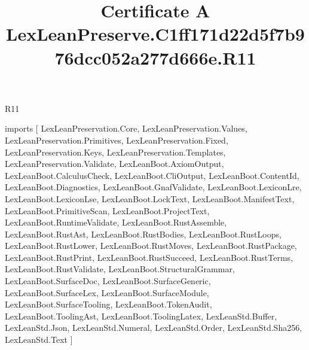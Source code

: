 \begin{lexlean}{R11}
\title{Certificate A LexLeanPreserve.C1ff171d22d5f7b976dcc052a277d666e.R11}
\begin{coremodule}
imports [
  LexLeanPreservation.Core,
  LexLeanPreservation.Values,
  LexLeanPreservation.Primitives,
  LexLeanPreservation.Fixed,
  LexLeanPreservation.Keys,
  LexLeanPreservation.Templates,
  LexLeanPreservation.Validate,
  LexLeanBoot.AxiomOutput,
  LexLeanBoot.CalculusCheck,
  LexLeanBoot.CliOutput,
  LexLeanBoot.ContentId,
  LexLeanBoot.Diagnostics,
  LexLeanBoot.GnafValidate,
  LexLeanBoot.LexiconLre,
  LexLeanBoot.LexiconLse,
  LexLeanBoot.LockText,
  LexLeanBoot.ManifestText,
  LexLeanBoot.PrimitiveScan,
  LexLeanBoot.ProjectText,
  LexLeanBoot.RuntimeValidate,
  LexLeanBoot.RustAssemble,
  LexLeanBoot.RustAst,
  LexLeanBoot.RustBodies,
  LexLeanBoot.RustLoops,
  LexLeanBoot.RustLower,
  LexLeanBoot.RustMoves,
  LexLeanBoot.RustPackage,
  LexLeanBoot.RustPrint,
  LexLeanBoot.RustSucceed,
  LexLeanBoot.RustTerms,
  LexLeanBoot.RustValidate,
  LexLeanBoot.StructuralGrammar,
  LexLeanBoot.SurfaceDoc,
  LexLeanBoot.SurfaceGeneric,
  LexLeanBoot.SurfaceLex,
  LexLeanBoot.SurfaceModule,
  LexLeanBoot.SurfaceTooling,
  LexLeanBoot.TokenAudit,
  LexLeanBoot.ToolingAst,
  LexLeanBoot.ToolingLatex,
  LexLeanStd.Buffer,
  LexLeanStd.Json,
  LexLeanStd.Numeral,
  LexLeanStd.Order,
  LexLeanStd.Sha256,
  LexLeanStd.Text
]


\end{coremodule}
\end{lexlean}
